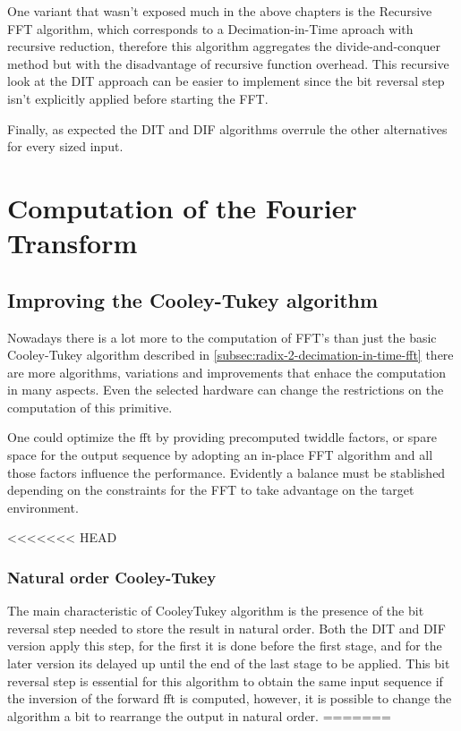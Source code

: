 \documentclass[
  oneside,
  11pt, a4paper,
  footinclude=true,
  headinclude=true,
  cleardoublepage=empty
]{scrbook}
\begin{document}
One variant that wasn't exposed much in the above chapters is the Recursive FFT algorithm, which corresponds to a Decimation-in-Time aproach with recursive reduction, therefore this algorithm aggregates the divide-and-conquer method but with the disadvantage of recursive function overhead. This recursive look at the DIT approach can be easier to implement since the bit reversal step isn't explicitly applied before starting the FFT.

Finally, as expected the DIT and DIF algorithms overrule the other alternatives for every sized input.



\chapter{Computation of the Fourier Transform}


\section{Improving the Cooley-Tukey algorithm}
Nowadays there is a lot more to the computation of FFT's than just the basic Cooley-Tukey algorithm described in \ref{subsec:radix-2-decimation-in-time-fft} there are more algorithms, variations and improvements that enhace the computation in many aspects. Even the selected hardware can change the restrictions on the computation of this primitive.

One could optimize the fft by providing precomputed twiddle factors, or spare space for the output sequence by adopting an in-place FFT algorithm  and all those factors influence the performance. Evidently a balance must be stablished depending on the constraints for the FFT to take advantage on the target environment.

<<<<<<< HEAD
\subsection{Natural order Cooley-Tukey}
The main characteristic of Cooley\-Tukey algorithm is the presence of the bit reversal step needed to store the result in natural order. Both the DIT and DIF version apply this step, for the first it is done before the first stage, and for the later version its delayed up until the end of the last stage to be applied. This bit reversal step is essential for this algorithm to obtain the same input sequence if the inversion of the forward fft is computed, however, it is possible to change the algorithm a bit to rearrange the output in natural order.  
=======
\end{document}
